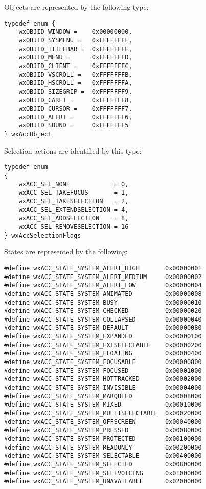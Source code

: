 Objects are represented by the following type:

{\small 
\begin{verbatim}
typedef enum {
    wxOBJID_WINDOW =    0x00000000,
    wxOBJID_SYSMENU =   0xFFFFFFFF,
    wxOBJID_TITLEBAR =  0xFFFFFFFE,
    wxOBJID_MENU =      0xFFFFFFFD,
    wxOBJID_CLIENT =    0xFFFFFFFC,
    wxOBJID_VSCROLL =   0xFFFFFFFB,
    wxOBJID_HSCROLL =   0xFFFFFFFA,
    wxOBJID_SIZEGRIP =  0xFFFFFFF9,
    wxOBJID_CARET =     0xFFFFFFF8,
    wxOBJID_CURSOR =    0xFFFFFFF7,
    wxOBJID_ALERT =     0xFFFFFFF6,
    wxOBJID_SOUND =     0xFFFFFFF5
} wxAccObject
\end{verbatim}
}

Selection actions are identified by
this type:

{\small 
\begin{verbatim}
typedef enum
{
    wxACC_SEL_NONE            = 0,
    wxACC_SEL_TAKEFOCUS       = 1,
    wxACC_SEL_TAKESELECTION   = 2,
    wxACC_SEL_EXTENDSELECTION = 4,
    wxACC_SEL_ADDSELECTION    = 8,
    wxACC_SEL_REMOVESELECTION = 16
} wxAccSelectionFlags
\end{verbatim}
}

States are represented by the following:

{\small 
\begin{verbatim}
#define wxACC_STATE_SYSTEM_ALERT_HIGH       0x00000001
#define wxACC_STATE_SYSTEM_ALERT_MEDIUM     0x00000002
#define wxACC_STATE_SYSTEM_ALERT_LOW        0x00000004
#define wxACC_STATE_SYSTEM_ANIMATED         0x00000008
#define wxACC_STATE_SYSTEM_BUSY             0x00000010
#define wxACC_STATE_SYSTEM_CHECKED          0x00000020
#define wxACC_STATE_SYSTEM_COLLAPSED        0x00000040
#define wxACC_STATE_SYSTEM_DEFAULT          0x00000080
#define wxACC_STATE_SYSTEM_EXPANDED         0x00000100
#define wxACC_STATE_SYSTEM_EXTSELECTABLE    0x00000200
#define wxACC_STATE_SYSTEM_FLOATING         0x00000400
#define wxACC_STATE_SYSTEM_FOCUSABLE        0x00000800
#define wxACC_STATE_SYSTEM_FOCUSED          0x00001000
#define wxACC_STATE_SYSTEM_HOTTRACKED       0x00002000
#define wxACC_STATE_SYSTEM_INVISIBLE        0x00004000
#define wxACC_STATE_SYSTEM_MARQUEED         0x00008000
#define wxACC_STATE_SYSTEM_MIXED            0x00010000
#define wxACC_STATE_SYSTEM_MULTISELECTABLE  0x00020000
#define wxACC_STATE_SYSTEM_OFFSCREEN        0x00040000
#define wxACC_STATE_SYSTEM_PRESSED          0x00080000
#define wxACC_STATE_SYSTEM_PROTECTED        0x00100000
#define wxACC_STATE_SYSTEM_READONLY         0x00200000
#define wxACC_STATE_SYSTEM_SELECTABLE       0x00400000
#define wxACC_STATE_SYSTEM_SELECTED         0x00800000
#define wxACC_STATE_SYSTEM_SELFVOICING      0x01000000
#define wxACC_STATE_SYSTEM_UNAVAILABLE      0x02000000
\end{verbatim}
}

